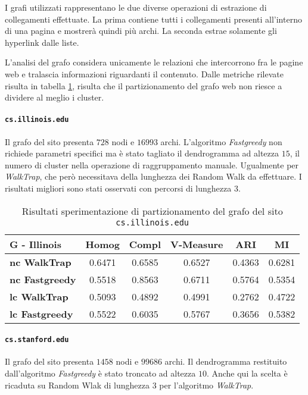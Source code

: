 I grafi utilizzati rappresentano le due diverse operazioni di estrazione di collegamenti effettuate. La prima contiene tutti i collegamenti presenti all'interno di una pagina e mostrerà quindi più archi. La seconda estrae solamente gli hyperlink dalle liste.

L'analisi del grafo considera unicamente le relazioni che intercorrono fra le pagine web e tralascia informazioni riguardanti il contenuto. Dalle metriche rilevate risulta in tabella \ref{metricheGraphIll}, risulta che il partizionamento del grafo web non riesce a dividere al meglio i cluster.
 
\paragraph{\texttt{cs.illinois.edu}} Il grafo del sito presenta $728$ nodi e $16993$ archi. L'algoritmo \textit{Fastgreedy} non richiede parametri specifici ma è stato tagliato il dendrogramma ad altezza $15$, il numero di cluster nella operazione di raggruppamento manuale. Ugualmente per \textit{WalkTrap}, che però necessitava della lunghezza dei Random Walk da effettuare. I risultati migliori sono stati osservati con percorsi di lunghezza $3$.
\begin{table}[H]
	\begin{tabular}{| l | c | c | c | c | c |}
	\hline
	\textbf{G - Illinois}  & \textbf{Homog} & \textbf{Compl} & \textbf{V-Measure}  & \textbf{ARI}  & \textbf{MI} \\ [3ex] \hline
	\textbf{nc WalkTrap} & 0.6471 & 0.6585 & 0.6527 & 0.4363 & 0.6281\\ [3ex]
	 \hline
	\textbf{nc Fastgreedy} & 0.5518 & 0.8563 & 0.6711 & 0.5764 & 0.5354\\ [3ex]
	 \hline	
	\textbf{lc WalkTrap} & 0.5093 & 0.4892 & 0.4991 & 0.2762 & 0.4722\\ [3ex]
	 \hline	
	\textbf{lc Fastgreedy} & 0.5522 & 0.6035 & 0.5767 & 0.3656 & 0.5382\\ [3ex]
	\hline
	\end{tabular}
	\caption{Risultati sperimentazione di partizionamento del grafo del sito \texttt{cs.illinois.edu}}
	\label{metricheGraphIll}
\end{table}
 
\paragraph{\texttt{cs.stanford.edu}} Il grafo del sito presenta $1458$ nodi e $99686$ archi. Il dendrogramma restituito dall'algoritmo \textit{Fastgreedy} è stato troncato ad altezza $10$. Anche qui la scelta è ricaduta su Random Wlak di lunghezza $3$ per l'algoritmo \textit{WalkTrap}.

